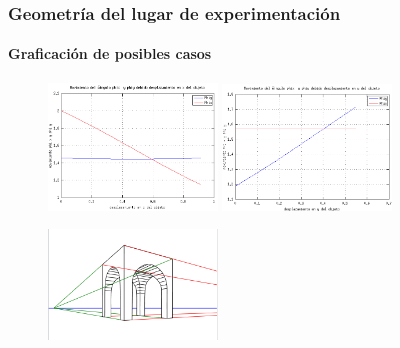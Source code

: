 \documentclass[10pt, compress]{beamer}
\begin{document}
\begin{frame}[fragile]
	\frametitle{Geometría del lugar de experimentación}
	\framesubtitle{Graficación de posibles casos}
		 \begin{figure}[htbp]
		 	\centering
		 	\includegraphics[width=0.4\textwidth]{./pictures/figure1}
		 	\includegraphics[width=0.4\textwidth]{./pictures/figure2}
		 \end{figure}
		 \begin{figure}[htbp]
		 	\includegraphics[width=0.4\textwidth]{./pictures/fuga}
		 \end{figure}
		 	
\end{frame}	
\end{document}
